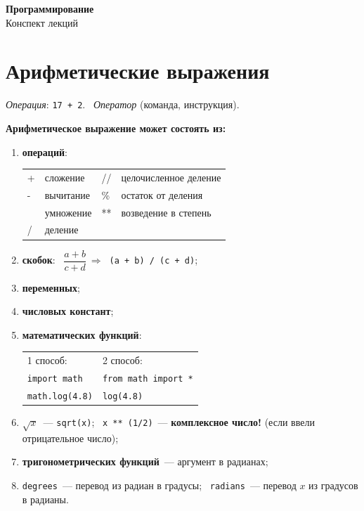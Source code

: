 \documentclass[a4paper,11pt]{article}
\newcommand{\lead}[1]{\textbf{\color{leadcol}#1}\ }
\begin{document}
\begin{center}
{\LARGE\bfseries\color{secred}Программирование}\\[3pt]
{\large Конспект лекций}
\end{center}
\vspace{-2mm}

\tableofcontents
\newpage


\section{Арифметические выражения}
\emph{Операция}: \texttt{17 + 2}. \ \emph{Оператор} (команда, инструкция).

\lead{Арифметическое выражение может состоять из:}
\begin{enumerate}[label=\arabic*)]
\item \textbf{операций}:\\[2pt]
\begin{tabular}{@{\qquad}>{\ttfamily}l@{\quad}l@{\qquad\qquad}>{\ttfamily}l@{\quad}l}
+  & сложение  & //  & целочисленное деление\\
-  & вычитание & \%  & остаток от деления\\
*  & умножение & **  & возведение в степень\\
/  & деление   &     &
\end{tabular}
\item \textbf{скобок}: \ $\dfrac{a+b}{c+d}\ \Rightarrow\ $ \texttt{(a + b) / (c + d)};
\item \textbf{переменных};
\item \textbf{числовых констант};
\item \textbf{математических функций}:\\[2pt]
\begin{tabular}{@{\qquad}l@{\qquad\qquad}l}
1 способ: & 2 способ:\\
\texttt{import math} & \texttt{from math import *}\\
\texttt{math.log(4.8)} & \texttt{log(4.8)}
\end{tabular}
\item $\sqrt x$~--- \texttt{sqrt(x)}; \ \texttt{x ** (1/2)}~--- \textbf{комплексное число!} (если ввели
отрицательное число);
\item \textbf{тригонометрических функций}~--- аргумент в радианах;
\item \texttt{degrees}~--- перевод из радиан в градусы; \ \texttt{radians}~--- перевод $x$ из градусов
в радианы.
\end{enumerate}
\end{document}
